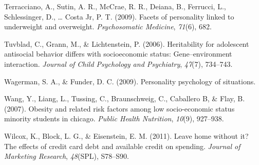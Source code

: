 \documentclass[man]{apa6}
\begin{document}
\leavevmode\hypertarget{ref-terracciano2009facets}{}%
Terracciano, A., Sutin, A. R., McCrae, R. R., Deiana, B., Ferrucci, L., Schlessinger, D., \ldots{} Costa Jr, P. T. (2009). Facets of personality linked to underweight and overweight. \emph{Psychosomatic Medicine}, \emph{71}(6), 682.

\leavevmode\hypertarget{ref-tuvblad2006heritability}{}%
Tuvblad, C., Grann, M., \& Lichtenstein, P. (2006). Heritability for adolescent antisocial behavior differs with socioeconomic status: Gene--environment interaction. \emph{Journal of Child Psychology and Psychiatry}, \emph{47}(7), 734--743.

\leavevmode\hypertarget{ref-wagerman2009personality}{}%
Wagerman, S. A., \& Funder, D. C. (2009). Personality psychology of situations.

\leavevmode\hypertarget{ref-wang2007}{}%
Wang, Y., Liang, L., Tussing, C., Braunschweig, C., Caballero B, \& Flay, B. (2007). Obesity and related risk factors among low socio-economic status minority students in chicago. \emph{Public Health Nutrition}, \emph{10}(9), 927--938.

\leavevmode\hypertarget{ref-wilcox2011leave}{}%
Wilcox, K., Block, L. G., \& Eisenstein, E. M. (2011). Leave home without it? The effects of credit card debt and available credit on spending. \emph{Journal of Marketing Research}, \emph{48}(SPL), S78--S90.

\endgroup
\end{document}
